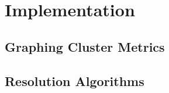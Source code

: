 \chapter{Implementation}\label{chap:implementation}
\section{Graphing Cluster Metrics}
\section{Resolution Algorithms}